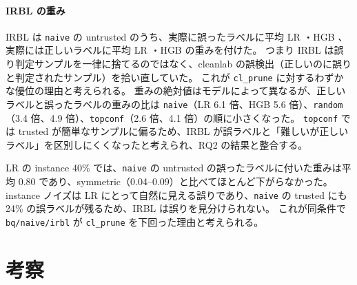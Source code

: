 \documentclass[a4paper,10pt]{ltjsarticle}
\newcommand{\method}[1]{\texttt{#1}}
\newcommand{\cl}{\textsf{cleanlab}}
\begin{document}
\paragraph{IRBL の重み}
IRBL は \method{naive} の untrusted のうち、実際に誤ったラベルに平均 LR \MechLRWNoisy{}・HGB \MechHGBWNoisy{}、実際には正しいラベルに平均 LR \MechLRWClean{}・HGB \MechHGBWClean{} の重みを付けた。
つまり IRBL は誤り判定サンプルを一律に捨てるのではなく、\cl{} の誤検出（正しいのに誤りと判定されたサンプル）を拾い直していた。
これが \method{cl\_prune} に対するわずかな優位の理由と考えられる。
重みの絶対値はモデルによって異なるが、正しいラベルと誤ったラベルの重みの比は \method{naive}（LR 6.1 倍、HGB 5.6 倍）、\method{random}（3.4 倍、4.9 倍）、\method{topconf}（2.6 倍、4.1 倍）の順に小さくなった。
\method{topconf} では trusted が簡単なサンプルに偏るため、IRBL が誤ラベルと「難しいが正しいラベル」を区別しにくくなったと考えられ、RQ2 の結果と整合する。

LR の instance 40\% では、\method{naive} の untrusted の誤ったラベルに付いた重みは平均 0.80 であり、symmetric（0.04--0.09）と比べてほとんど下がらなかった。
instance ノイズは LR にとって自然に見える誤りであり、\method{naive} の trusted にも 24\% の誤ラベルが残るため、IRBL は誤りを見分けられない。
これが同条件で \method{bq/naive/irbl} が \method{cl\_prune} を下回った理由と考えられる。

\begin{table}[tbp]
  \centering
  \caption{GLC（\texttt{gold}）が推定した遷移行列の対角成分の平均と、untrusted の正しいラベルの割合（3 データセット $\times$ 5 シードの平均）。真値はデータ全体の真の遷移行列の対角成分をクラスについて単純平均した値 $\frac{1}{K}\sum_{k} T_{kk}$ である。instance ノイズでは誤りやすいクラスに反転が偏るため、サンプル単位のノイズ率 $\rho$ とは一致しない。}
  \label{tab:mech-glc}
  \scriptsize
  \setlength{\tabcolsep}{3.5pt}
  
\end{table}

\begin{table}[tbp]
  \centering
  \caption{IRBL が untrusted に付けた重みの平均（3 データセット $\times$ 5 シードの平均）。誤・正は、untrusted のうち実際に誤ったラベル・正しいラベルのサンプル。}
  \label{tab:mech-irbl}
  \footnotesize
  
\end{table}

\section{考察}\label{sec:discussion}
\end{document}
